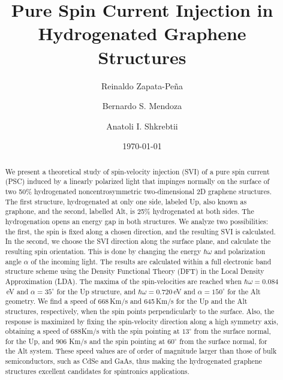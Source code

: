 \documentclass[floatfix,prb,aps,superscriptaddress,showpacs,11pt,preprint,letterpaper]{revtex4}
\begin{document}
\title{Pure Spin Current Injection in Hydrogenated Graphene Structures}
\author{Reinaldo Zapata-Pe\~na}
\author{Bernardo S. Mendoza}
\author{Anatoli I. Shkrebtii}

\date{\today}

\begin{abstract}
We present a theoretical study of spin-velocity injection (SVI) of a pure spin
current (PSC) induced by  a linearly polarized light that impinges normally on
the surface of  two 50\% hydrogenated noncentrosymmetric two-dimensional 2D
graphene structures. The first structure, hydrogenated at only one side,
labeled Up, also known as graphone, and the second, labelled Alt, is
25\% hydrogenated at both sides. The hydrogenation opens an energy gap in both
structures. We analyze two possibilities: the first, the spin is fixed
along a chosen direction, and the resulting SVI is calculated.
In the second, we choose the SVI direction along
the surface plane, and calculate the resulting
spin orientation. This is done by changing the energy
$\hbar\omega$ and polarization angle $\alpha$  of the incoming  light. The
results are calculated within a full electronic band structure scheme using the
Density Functional Theory (DFT) in the Local Density Approximation (LDA). The
maxima of the spin-velocities are reached when $\hbar\omega=0.084$\,eV and
$\alpha=35^\circ$ for the Up structure, and $\hbar\omega=0.720$\,eV and
$\alpha=150^\circ$ for the Alt geometry. We find a speed of 668\,Km/s and
645\,Km/s for the Up and the Alt structures, respectively, when the spin points
perpendicularly to the surface. Also, the response is maximized by
fixing the spin-velocity direction 
along a high symmetry  axis, obtaining a speed of 688Km/s
with the spin pointing at $13^\circ$ from the surface normal, for the Up, 
and 906 Km/s and the spin pointing at $60^\circ$ from the surface normal, for
the Alt system. These speed values are  of order of magnitude larger than those of bulk semiconductors,
such as CdSe and GaAs, thus making the hydrogenated graphene structures
excellent candidates for spintronics applications. 
\end{abstract}

\maketitle
\end{document}
